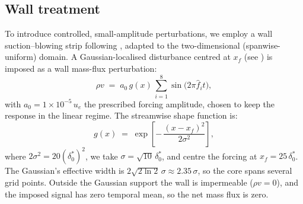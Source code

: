 
\subsection{Wall treatment}

To introduce controlled, small-amplitude perturbations, we employ a wall suction--blowing strip following \cite{AlamSandham2000}, adapted to the two-dimensional (spanwise-uniform) domain. A Gaussian-localised disturbance centred at $x_f$ (see ) is imposed as a wall mass-flux perturbation:
\begin{equation}
  \rho v \;=\; a_0\, g(x)\, \sum_{i=1}^{8} \sin\!\big(2\pi \hat{f}_i t\big),
\end{equation}
with $a_0 = 1\times10^{-5}\,u_e$ the prescribed forcing amplitude, chosen to keep the response in the linear regime. The streamwise shape function is:
\begin{equation}
  g(x) \;=\; \exp\!\left[-\,\frac{(x-x_f)^2}{2\sigma^2}\right],
\end{equation}
where $2\sigma^2 = 20(\delta_0^{*})^2$, we take $\sigma=\sqrt{10}\,\delta_0^{*}$, and centre the forcing at $x_f = 25\,\delta_0^{*}$. The Gaussian's effective width is $2\sqrt{2\ln 2}\,\sigma \approx 2.35\,\sigma$, so the core spans several grid points. Outside the Gaussian support the wall is impermeable ($\rho v=0$), and the imposed signal has zero temporal mean, so the net mass flux is zero.


